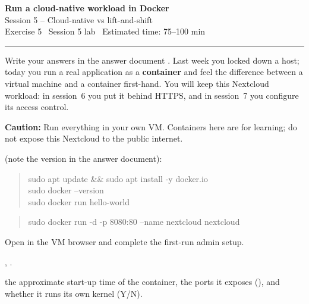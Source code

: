 \documentclass[11pt]{article}
\begin{document}
\begin{center}
  {\LARGE\bfseries Run a cloud-native workload in Docker}\\[3pt]
  {\large Session 5 -- Cloud-native vs lift-and-shift}\\[5pt]
  {\small Exercise 5 \textperiodcentered\ Session 5 lab \textperiodcentered\ Estimated time: 75--100 min}
\end{center}
\vspace{2pt}\hrule\vspace{1.1em}

Write your answers in the answer document . Last week you locked down a host; today you run a real
application as a \textbf{container} and feel the difference between a virtual machine and a container
first-hand. You will keep this Nextcloud workload: in session~6 you put it behind HTTPS, and in
session~7 you configure its access control.

\noindent\textbf{Caution:} Run everything in your own VM. Containers here are for learning; do not
expose this Nextcloud to the public internet.

 (note the version in the answer document):
\begin{quote}\ttfamily
sudo apt update \&\& sudo apt install -y docker.io\\
sudo docker --version\\
sudo docker run hello-world
\end{quote}

\begin{quote}\ttfamily
sudo docker run -d -p 8080:80 --name nextcloud nextcloud
\end{quote}
Open  in the VM browser and complete the first-run admin setup.

 , .

 the approximate
start-up time of the container, the ports it exposes (), and whether it runs its own
kernel (Y/N).

\end{document}
